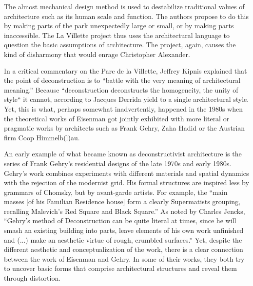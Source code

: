 The almost mechanical design method is used to destabilize traditional
values of architecture such as its human scale and function. The authors propose to do this by
making parts of the park unexpectedly large or small, or by making parts inaccessible.
The La Villette project thus uses the architectural language to question the basic assumptions
of architecture. The project, again, causes the kind of disharmony that would enrage Christopher
Alexander.

In a critical commentary on the Parc de la Villette, Jeffrey Kipnis explained that
the point of deconstruction is to ``battle with the very meaning of architectural
meaning.'' Because ``deconstruction deconstructs the
homogeneity, the unity of style`` it cannot, according to Jacques Derrida yield to
a single architectural style. Yet, this is what, perhaps somewhat inadvertently, happened
in the 1980s when the theoretical works of Eisenman got jointly exhibited with more literal
or pragmatic works by architects such as Frank Gehry, Zaha Hadid or the Austrian firm Coop
Himmelb(l)au. %

An early example of what became known as deconstructivist architecture is the series of Frank
Gehry's residential designs of the late 1970s and early 1980s. Gehry's work combines
experiments with different materials and spatial dynamics with the rejection of the modernist
grid.
His formal structures are inspired less by grammars of Chomsky, but by avant-garde artists.
For example, the ``main masses [of his Familian Residence house] form a clearly Supermatists
grouping, recalling Malevich's Red Square and Black Square.''
As noted by Charles Jencks, ``Gehry’s method of Deconstruction can be quite literal at
times, since he will smash an existing building into parts, leave elements of his own work
unfinished and (...) make an aesthetic virtue of rough, crumbled surfaces.'' Yet, despite the different aesthetic and conceptualization
of the work, there is a clear connection between the work of Eisenman and Gehry. In some of their
works, they both try to uncover basic forms that comprise architectural structures and reveal them
through distortion.

